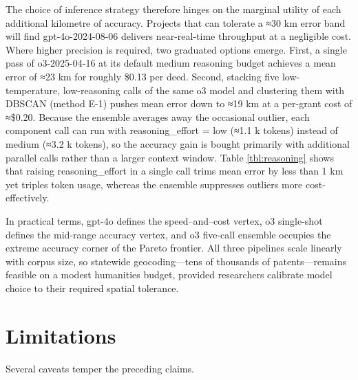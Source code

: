 The choice of inference strategy therefore hinges on the marginal
utility of each additional kilometre of accuracy. Projects that can
tolerate a ≈30 km error band will find gpt-4o-2024-08-06 delivers
near-real-time throughput at a negligible cost. Where higher precision
is required, two graduated options emerge. First, a single pass of
o3-2025-04-16 at its default medium reasoning budget achieves a mean
error of ≈23 km for roughly \$0.13 per deed. Second, stacking five
low-temperature, low-reasoning calls of the same o3 model and clustering
them with DBSCAN (method E-1) pushes mean error down to ≈19 km at a
per-grant cost of ≈\$0.20. Because the ensemble averages away the
occasional outlier, each component call can run with reasoning\_effort =
low (≈1.1 k tokens) instead of medium (≈3.2 k tokens), so the accuracy
gain is bought primarily with additional parallel calls rather than a
larger context window. Table \ref{tbl:reasoning} shows that raising
reasoning\_effort in a single call trims mean error by less than 1 km
yet triples token usage, whereas the ensemble suppresses outliers more
cost-effectively.

In practical terms, gpt-4o defines the speed--and--cost vertex, o3
single-shot defines the mid-range accuracy vertex, and o3 five-call
ensemble occupies the extreme accuracy corner of the Pareto frontier.
All three pipelines scale linearly with corpus size, so statewide
geocoding---tens of thousands of patents---remains feasible on a modest
humanities budget, provided researchers calibrate model choice to their
required spatial tolerance.

\section{Limitations}\label{limitations}

Several caveats temper the preceding claims.

